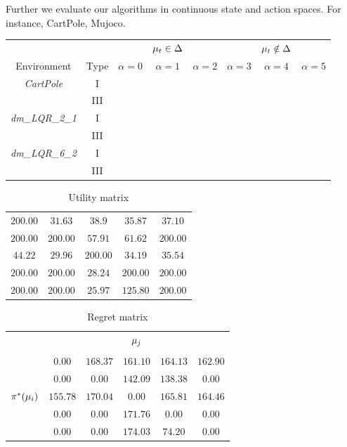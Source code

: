 Further we evaluate our algorithms in continuous state and action spaces. For instance, CartPole, Mujoco.

\begin{table}[t]
    \centering
    \begin{tabular}{c c c c c c c c}
    & & & $\mu_t \in \Delta$& & &$\mu_t \notin \Delta$ &\\
        Environment & Type & $\alpha=0$ & $\alpha=1$ & $\alpha=2$ & $\alpha=3$ & $\alpha=4$ & $\alpha=5$ \\ \hline
          \emph{CartPole} & I & & & & & & \\
          & III & & & & & & \\
          \emph{dm\_LQR\_2\_1} & I & & & & &\\
           & III & & & & &\\
          \emph{dm\_LQR\_6\_2} & I & & & & & \\
           & III & & & & &\\
    \end{tabular}
\end{table}

\begin{table}[]
    \centering
    \begin{tabular}{c c c c c}
         $200.00$& $31.63$& $38.9$& $35.87$& $37.10$ \\
         $200.00$& $200.00$& $57.91$& $61.62$& $200.00$ \\
         $44.22$& $29.96$& $200.00$& $34.19$& $35.54$ \\
         $200.00$& $200.00$& $28.24$& $200.00$& $200.00$ \\
         $200.00$& $200.00$& $25.97$& $125.80$& $200.00$
    \end{tabular}
    \caption{Utility matrix}
    \label{tab:my_label}
\end{table}

\begin{table}[]
    \centering
    \begin{tabular}{c c c c c c}
    & & & $\mu_j$ & & \\ \\
         & $0.00$& $168.37$& $161.10$& $164.13$& $162.90$ \\
         & $0.00$& $0.00$& $142.09$& $138.38$& $0.00$ \\
         $\pi^{*}(\mu_i)$& $155.78$& $170.04$& $0.00$& $165.81$& $164.46$ \\
         &$0.00$& $0.00$& $171.76$& $0.00$& $0.00$ \\
         &$0.00$& $0.00$& $174.03$& $74.20$& $0.00$
    \end{tabular}
    \caption{Regret matrix}
    \label{tab:my_label}
\end{table}

